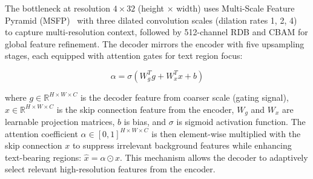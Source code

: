 \documentclass[journal]{IEEEtran}
\begin{document}
The bottleneck at resolution $4 \times 32$ (height $\times$ width) uses Multi-Scale Feature Pyramid (MSFP)~\cite{lin2017fpn} with three dilated convolution scales (dilation rates 1, 2, 4)~\cite{chen2017deeplab} to capture multi-resolution context, followed by 512-channel RDB and CBAM for global feature refinement. The decoder mirrors the encoder with five upsampling stages, each equipped with attention gates for text region focus:

\begin{equation}
\alpha = \sigma(W_g^T g + W_x^T x + b)
\end{equation}

\noindent where $g \in \mathbb{R}^{H \times W \times C}$ is the decoder feature from coarser scale (gating signal), $x \in \mathbb{R}^{H \times W \times C}$ is the skip connection feature from the encoder, $W_g$ and $W_x$ are learnable projection matrices, $b$ is bias, and $\sigma$ is sigmoid activation function. The attention coefficient $\alpha \in [0,1]^{H \times W \times C}$ is then element-wise multiplied with the skip connection $x$ to suppress irrelevant background features while enhancing text-bearing regions: $\hat{x} = \alpha \odot x$. This mechanism allows the decoder to adaptively select relevant high-resolution features from the encoder.
\end{document}
